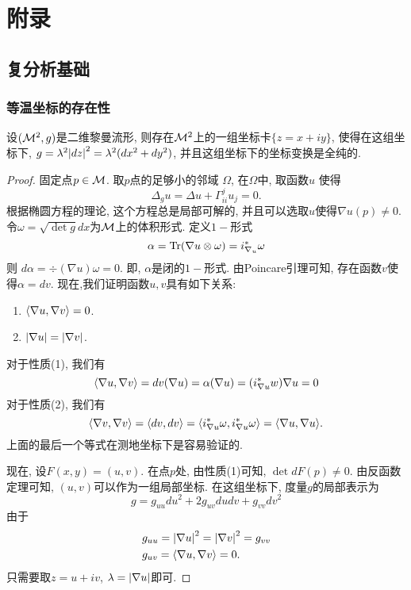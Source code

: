\chapter{附录}
\section{复分析基础}
\subsection{等温坐标的存在性}
\begin{theorem}
    设$({\mathcal{M}}^2, g)$是二维黎曼流形, 则存在${\mathcal{M}}^2$上的一组坐标卡$\{z=x+iy\}$, 使得在这组坐标下, $g=\lambda^2{\left | dz \right |}^2=\lambda^2(dx^2+dy^2)$, 并且这组坐标下的坐标变换是全纯的.
\end{theorem}
\begin{proof}
    固定点$p \in {\mathcal{M}}$. 取$p$点的足够小的邻域 $\Omega$, 在$\Omega$中, 取函数$u$ 使得
    \begin{equation}
        \Delta_g u= \Delta u + \Gamma^j_{ii}u_j=0.
    \end{equation}
    根据椭圆方程的理论, 这个方程总是局部可解的, 并且可以选取$u$使得$\nabla u(p) \ne 0$. 令$\omega= \sqrt{\det g}dx$为${\mathcal{M}}$上的体积形式. 定义$1-$形式
    \begin{equation}
        \alpha= {\text{Tr}}(\nabla u \otimes \omega)= i^*_{\nabla_u } \omega
    \end{equation}
    则 $d\alpha= \div(\nabla u)\omega =0$. 即, $\alpha$是闭的$1-$形式. 由Poincare引理可知, 存在函数$v$使得$\alpha= dv$.  现在,我们证明函数$u,v$具有如下关系:
    \begin{enumerate}
        \item ${\left < \nabla u, \nabla v \right >} =0$.
        \item ${\left | \nabla u \right |}= {\left | \nabla v \right |}$.
    \end{enumerate}
    对于性质(1), 我们有
    \begin{equation}
        {\left < \nabla u, \nabla v \right >} = dv(\nabla u) = \alpha(\nabla u)= (i^*_{\nabla u} w)\nabla u =0
    \end{equation}
    对于性质(2), 我们有
    \begin{equation}
        {\left < \nabla v, \nabla v \right >} = {\left < dv, dv \right >} = {\left < i^*_{\nabla u}\omega ,  i^*_{\nabla u}\omega \right >}= {\left < \nabla u, \nabla u \right >}.
    \end{equation}
    上面的最后一个等式在测地坐标下是容易验证的. 
    \par 现在, 设$F(x,y)=(u,v)$. 在点$p$处, 由性质(1)可知, $\det dF(p) \ne 0$. 由反函数定理可知, $(u,v)$可以作为一组局部坐标. 在这组坐标下, 度量$g$的局部表示为
    \begin{equation}
        g=g_{uu}du^2+2g_{uv}dudv+g_{vv}dv^2
    \end{equation}
    由于
    \begin{align}
        &g_{uu}= {\left | \nabla u \right |}^2 = {\left | \nabla v \right |}^2= g_{vv} \\
        &g_{uv}={\left < \nabla u, \nabla v \right >}=0. 
    \end{align}
    只需要取$z=u+iv$, $\lambda= {\left | \nabla u \right |}$即可.
\end{proof}
